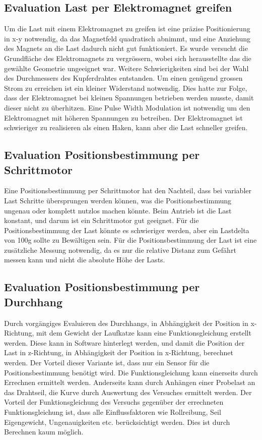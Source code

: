 \documentclass[a4paper]{report}
\begin{document}
\subsection{Evaluation Last per Elektromagnet greifen}
\label{app:ssec:EvalLastElektroMagnet}
Um die Last mit einem Elektromagnet zu greifen ist eine präzise Positionierung in x-y notwendig, da das Magnetfeld quadratisch abnimmt, und eine Anziehung des Magnets an die Last dadurch nicht gut funktioniert. Es wurde versucht die Grundfläche des Elektromagnets zu vergrössern, wobei sich herausstellte das die gewählte Geometrie ungeeignet war. Weitere Schwierigkeiten sind bei der Wahl des Durchmessers des Kupferdrahtes entstanden. Um einen genügend grossen Strom zu erreichen ist ein kleiner Widerstand notwendig. Dies hatte zur Folge, dass der Elektromagnet bei kleinen Spannungen betrieben werden musste, damit dieser nicht zu überhitzen. Eine Pulse Width Modulation ist notwendig um den Elektromagnet mit höheren Spannungen zu betreiben. Der Elektromagnet ist schwieriger zu realisieren als einen Haken, kann aber die Last schneller greifen.

\subsection{Evaluation Positionsbestimmung per Schrittmotor}
\label{app:ssec:EvalPosBestSchritt}
Eine Positionsbestimmung per Schrittmotor hat den Nachteil, dass bei variabler Last Schritte übersprungen werden können, was die Positionsbestimmung ungenau oder komplett nutzlos machen könnte. Beim Antrieb ist die Last konstant, und darum ist ein Schrittmotor gut geeignet. Für die Positionsbestimmung der Last könnte es schwieriger werden, aber ein Lastdelta von 100g sollte zu Bewältigen sein. Für die Positionsbestimmung der Last ist eine zusätzliche Messung notwendig, da es nur die relative Distanz zum Gefährt messen kann und nicht die absolute Höhe der Lasts.

\subsection{Evaluation Positionsbestimmung per Durchhang}
\label{app:ssec:EvalPosBestDurch}
Durch vorgängiges Evaluieren des Durchhangs, in Abhängigkeit der Position in x-Richtung, mit dem Gewicht der Laufkatze kann eine Funktionsgleichung erstellt werden. Diese kann in Software hinterlegt werden, und damit die Position der Last in z-Richtung, in Abhängigkeit der Position in x-Richtung, berechnet werden. Der Vorteil dieser Variante ist, dass nur ein Sensor für die Positionsbestimmung benötigt wird. Die Funktionsgleichung kann einerseits durch Errechnen ermittelt werden. Anderseits kann durch Anhängen einer Probelast an das Drahtseil, die Kurve durch Auswertung des Versuches ermittelt werden. Der Vorteil der Funktionsgleichung des Versuchs gegenüber der errechneten Funktionsgleichung ist, dass alle Einflussfaktoren wie Rollreibung, Seil Eigengewicht, Ungenauigkeiten etc. berücksichtigt werden. Dies ist durch Berechnen kaum möglich.
\end{document}
